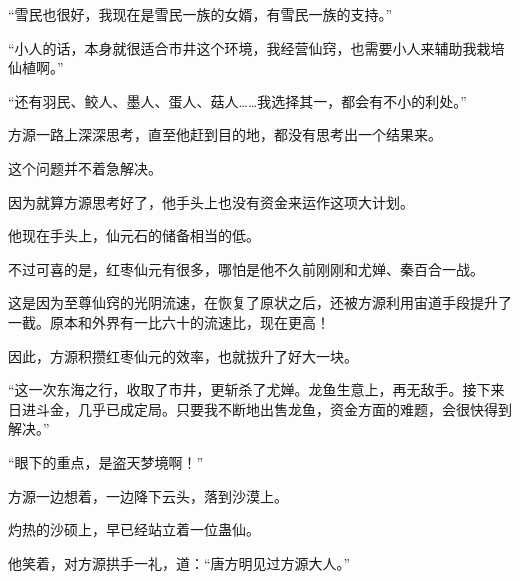 \begin{this_body}
“雪民也很好，我现在是雪民一族的女婿，有雪民一族的支持。”

“小人的话，本身就很适合市井这个环境，我经营仙窍，也需要小人来辅助我栽培仙植啊。”

“还有羽民、鲛人、墨人、蛋人、菇人……我选择其一，都会有不小的利处。”

方源一路上深深思考，直至他赶到目的地，都没有思考出一个结果来。

这个问题并不着急解决。

因为就算方源思考好了，他手头上也没有资金来运作这项大计划。

他现在手头上，仙元石的储备相当的低。

不过可喜的是，红枣仙元有很多，哪怕是他不久前刚刚和尤婵、秦百合一战。

这是因为至尊仙窍的光阴流速，在恢复了原状之后，还被方源利用宙道手段提升了一截。原本和外界有一比六十的流速比，现在更高！

因此，方源积攒红枣仙元的效率，也就拔升了好大一块。

“这一次东海之行，收取了市井，更斩杀了尤婵。龙鱼生意上，再无敌手。接下来日进斗金，几乎已成定局。只要我不断地出售龙鱼，资金方面的难题，会很快得到解决。”

“眼下的重点，是盗天梦境啊！”

方源一边想着，一边降下云头，落到沙漠上。

灼热的沙硕上，早已经站立着一位蛊仙。

他笑着，对方源拱手一礼，道：“唐方明见过方源大人。”

\end{this_body}

